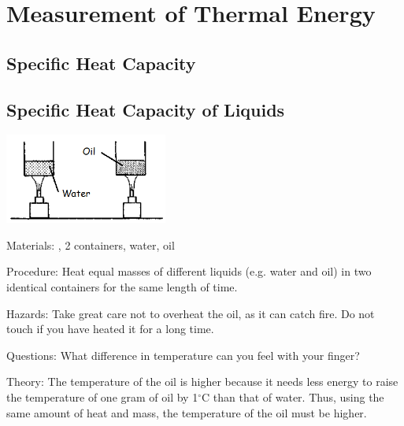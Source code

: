 \section{Measurement of Thermal Energy}

\begin{multicols}{2}


\section*{Specific Heat Capacity}


\subsection{Specific Heat Capacity of Liquids}

\begin{center}
\includegraphics[width=0.4\textwidth]{./img/source/shc-liquids.png}
\end{center}

\begin{description*}
\item[Materials:]{, 2 containers, water, oil}
\item[Procedure:]{Heat equal masses of different liquids (e.g. water and oil) in two identical containers for the same length of time.}
\item[Hazards:]{Take great care not to overheat the oil, as it can catch fire. Do not touch if you have heated it for a long time.}
\item[Questions:]{What difference in temperature can you feel with your finger?}
\item[Theory:]{The temperature of the oil is higher because it needs less energy to raise the temperature of one gram of oil by 1$^\circ$C than that of water. Thus, using the same amount of heat and mass, the temperature of the oil must be higher.}
\end{description*}


\end{multicols}

